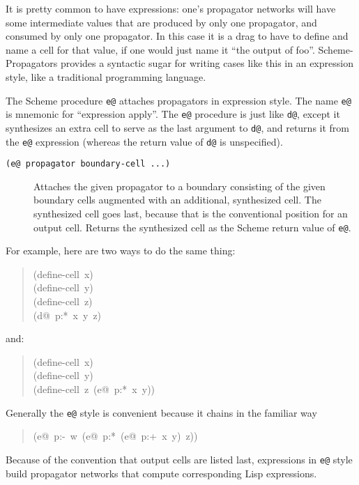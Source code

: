 \documentclass[12pt,letterpaper,english]{article}
\begin{document}
It is pretty common to have expressions: one's propagator networks
will have some intermediate values that are produced by only one
propagator, and consumed by only one propagator.  In this case it is a
drag to have to define and name a cell for that value, if one would
just name it ``the output of foo''.  Scheme-Propagators provides a
syntactic sugar for writing cases like this in an expression style, like a
traditional programming language.

The Scheme procedure \texttt{e@} attaches propagators in expression style.
The name \texttt{e@} is mnemonic for ``expression apply''.  The \texttt{e@}
procedure is just like \texttt{d@}, except it synthesizes an extra cell to
serve as the last argument to \texttt{d@}, and returns it from the \texttt{e@}
expression (whereas the return value of \texttt{d@} is unspecified).
\begin{description}
\item[{\texttt{(e@ propagator boundary-cell ...)}}] \leavevmode 
Attaches the given propagator to a boundary consisting of the given
boundary cells augmented with an additional, synthesized cell.  The
synthesized cell goes last, because that is the conventional
position for an output cell.  Returns the synthesized cell as the
Scheme return value of \texttt{e@}.

\end{description}

For example, here are two ways to do the same thing:
\begin{quote}{\ttfamily \raggedright \noindent
(define-cell~x)~\\
(define-cell~y)~\\
(define-cell~z)~\\
(d@~p:*~x~y~z)
}\end{quote}
and:
\begin{quote}{\ttfamily \raggedright \noindent
(define-cell~x)~\\
(define-cell~y)~\\
(define-cell~z~(e@~p:*~x~y))
}\end{quote}

Generally the \texttt{e@} style is convenient because it chains in
the familiar way
\begin{quote}{\ttfamily \raggedright \noindent
(e@~p:-~w~(e@~p:*~(e@~p:+~x~y)~z))
}\end{quote}

Because of the convention that output cells are listed last,
expressions in \texttt{e@} style build propagator networks that
compute corresponding Lisp expressions.
\end{document}
